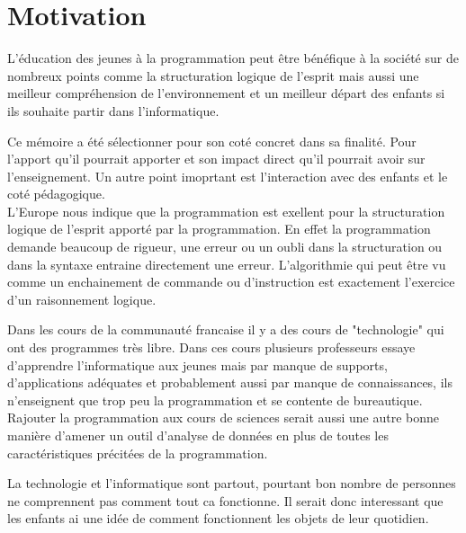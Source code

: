 \section{Motivation}
\label{intro-motivation}
L'éducation des jeunes à la programmation peut être bénéfique à la société sur de nombreux points comme la structuration logique de l'esprit mais aussi une meilleur compréhension de l'environnement et un meilleur départ des enfants si ils souhaite partir dans l'informatique.

Ce mémoire a été sélectionner pour son coté concret dans sa finalité. Pour l'apport qu'il pourrait apporter et son impact direct qu'il pourrait avoir sur l'enseignement.
Un autre point imoprtant est l'interaction avec des enfants et le coté pédagogique.\\

L'Europe nous indique que la programmation est exellent pour la structuration logique de l'esprit apporté par la programmation. En effet la programmation demande beaucoup de rigueur, une erreur ou un oubli dans la structuration ou dans la syntaxe entraine directement une erreur. L'algorithmie qui peut être vu comme un enchainement de commande ou d'instruction est exactement l'exercice d'un raisonnement logique.

Dans les cours de la communauté francaise il y a des cours de "technologie" qui ont des programmes très libre. Dans ces cours plusieurs professeurs essaye d'apprendre l'informatique aux jeunes mais par manque de supports, d'applications adéquates et probablement aussi par manque de connaissances, ils n'enseignent que trop peu la programmation et se contente de bureautique. Rajouter la programmation aux cours de sciences serait aussi une autre bonne manière d'amener un outil d'analyse de données en plus de toutes les caractéristiques précitées de la programmation.

La technologie et l'informatique sont partout, pourtant bon nombre de personnes ne comprennent pas comment tout ca fonctionne. Il serait donc interessant que les enfants ai une idée de comment fonctionnent les objets de leur quotidien.
